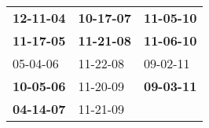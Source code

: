 \begin{supertabular}{p{0.33\columnwidth}p{0.33\columnwidth}p{0.33\columnwidth}}
 \textbf{12-11-04\textsuperscript{}} &  \textbf{10-17-07\textsuperscript{}} &  \textbf{11-05-10\textsuperscript{}} \\
 \textbf{11-17-05\textsuperscript{}} &  \textbf{11-21-08\textsuperscript{}} &  \textbf{11-06-10\textsuperscript{}} \\
          05-04-06\textsuperscript{} &           11-22-08\textsuperscript{} &           09-02-11\textsuperscript{} \\
 \textbf{10-05-06\textsuperscript{}} &           11-20-09\textsuperscript{} &  \textbf{09-03-11\textsuperscript{}} \\
 \textbf{04-14-07\textsuperscript{}} &           11-21-09\textsuperscript{} &                                      \\
\end{supertabular}
